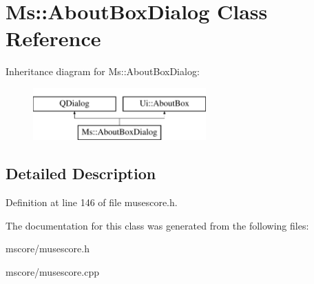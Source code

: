 \hypertarget{class_ms_1_1_about_box_dialog}{}\section{Ms\+:\+:About\+Box\+Dialog Class Reference}
\label{class_ms_1_1_about_box_dialog}
Inheritance diagram for Ms\+:\+:About\+Box\+Dialog\+:\begin{figure}[H]
\begin{center}
\leavevmode
\includegraphics[height=2.000000cm]{class_ms_1_1_about_box_dialog}
\end{center}
\end{figure}


\subsection{Detailed Description}


Definition at line 146 of file musescore.\+h.



The documentation for this class was generated from the following files\+:\begin{DoxyCompactItemize}
\item 
mscore/musescore.\+h\item 
mscore/musescore.\+cpp\end{DoxyCompactItemize}
